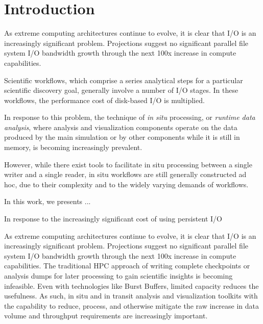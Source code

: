 \section{Introduction}
\label{s:intro}

As extreme computing architectures continue to evolve, it is 
clear that I/O is an increasingly significant problem.  Projections suggest no
significant parallel file system I/O bandwidth growth through the next 100x
increase in compute capabilities.

Scientific workflows, which comprise a series analytical steps for a
particular scientific discovery goal, generally involve a number of
I/O stages. In these workflows, the performance cost of disk-based I/O
is multiplied.

In response to this problem, the technique of \textit{in situ}
processing, or \textit{runtime data analysis},
where analysis and visualization components
operate on the data produced by the main simulation
or by other components while it is still in memory,
is becoming increasingly prevalent.

However, while there exist tools to facilitate in situ
processing between a single writer and a single reader, 
in situ workflows are still generally constructed ad hoc,
due to their complexity and to the widely varying demands
of workflows.

In this work, we presents \sys...

In response to the increasingly significant cost of using
persistent I/O 

As extreme computing architectures continue to evolve, it is 
clear that I/O is an increasingly significant problem.  Projections suggest no
significant parallel file system I/O bandwidth growth through the next 100x
increase in compute capabilities.  The traditional HPC approach of writing
complete checkpoints or analysis dumps for later processing to gain scientific
insights is becoming infeasible.  Even with technologies like Burst Buffers,
limited capacity reduces the usefulness. As such, in situ and in transit
analysis and visualization toolkits with the capability to reduce, process, and
otherwise mitigate the raw increase in data volume and throughput requirements
are increasingly important.


